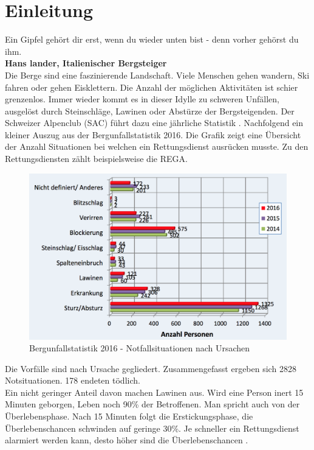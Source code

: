 \documentclass[11pt,english,german]{report}
\theoremstyle{definition}
\begin{document}
\chapter{Einleitung}
Ein Gipfel gehört dir erst, wenn du wieder unten bist - denn vorher gehörst du ihm.\\[0.3cm]
\textbf{Hans lander, Italienischer Bergsteiger\cite{kammerlander}} \\[0.5cm]
\noindent
Die Berge sind eine faszinierende Landschaft. Viele Menschen gehen wandern, Ski fahren oder gehen Eisklettern. Die Anzahl der möglichen Aktivitäten ist schier grenzenlos. Immer wieder kommt es in dieser Idylle zu schweren Unfällen, ausgelöst durch Steinschläge, Lawinen oder Abstürze der Bergsteigenden. Der Schweizer Alpenclub (SAC) führt dazu eine jährliche Statistik \cite{sacaccident}. Nachfolgend ein kleiner Auszug aus der Bergunfallstatistik 2016. Die Grafik zeigt eine Übersicht der Anzahl Situationen bei welchen ein Rettungsdienst ausrücken musste. Zu den Rettungsdiensten zählt beispielsweise die REGA.\\
\begin{figure}[H]
	\centering
	\includegraphics[width=\textwidth]{img/alps/sac_accidentstatistic_2016_reason.png}
	\caption[Bergunfallstatistik 2016 - Notfallsituationen nach Unrsachen]
	{Bergunfallstatistik 2016 - Notfallsituationen nach Ursachen}
\end{figure}
\noindent
Die Vorfälle sind nach Ursache gegliedert. Zusammengefasst ergeben sich 2828 Notsituationen. 178 endeten tödlich.\\[0.3cm]
Ein nicht geringer Anteil davon machen Lawinen aus. Wird eine Person inert 15 Minuten geborgen, Leben noch 90\% der Betroffenen. Man spricht auch von der Überlebensphase. Nach 15 Minuten folgt die Erstickungsphase, die Überlebenschancen schwinden auf geringe 30\%. Je schneller ein Rettungsdienst alarmiert werden kann, desto höher sind die Überlebenschancen \cite{avalancheaccident}. 
\end{document}
